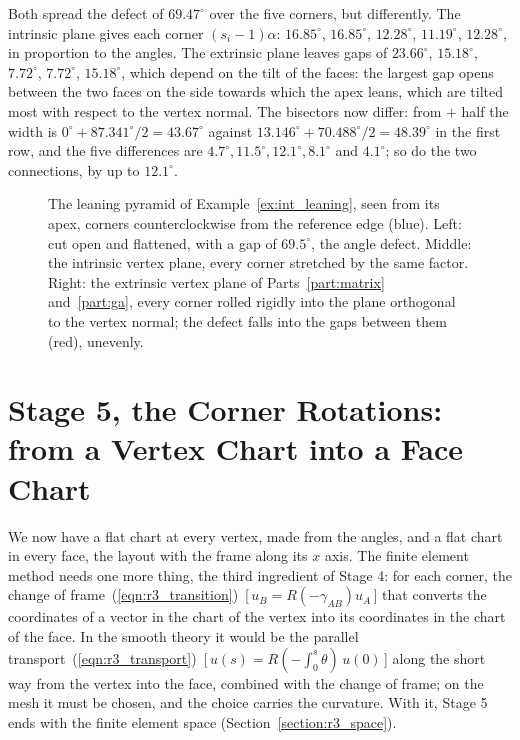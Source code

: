 \begin{example}
Both spread the defect of $69.47^\circ$ over the five corners, but differently. The intrinsic plane gives each corner $(s_i - 1)\alpha$: $16.85^\circ$, $16.85^\circ$, $12.28^\circ$, $11.19^\circ$, $12.28^\circ$, in proportion to the angles. The extrinsic plane leaves gaps of $23.66^\circ$, $15.18^\circ$, $7.72^\circ$, $7.72^\circ$, $15.18^\circ$, which depend on the tilt of the faces: the largest gap opens between the two faces on the side towards which the apex leans, which are tilted most with respect to the vertex normal. The bisectors now differ: from $+$ half the width is $0^\circ + 87.341^\circ/2 = 43.67^\circ$ against $13.146^\circ + 70.488^\circ/2 = 48.39^\circ$ in the first row, and the five differences are $4.7^\circ, 11.5^\circ, 12.1^\circ, 8.1^\circ$ and $4.1^\circ$; so do the two connections, by up to $12.1^\circ$.
\end{example}
\begin{figure}[t]
\centering
{}
\caption{The leaning pyramid of Example~\ref{ex:int_leaning}, seen from its apex, corners counterclockwise from the reference edge (blue). Left: cut open and flattened, with a gap of $69.5^\circ$, the angle defect. Middle: the intrinsic vertex plane, every corner stretched by the same factor. Right: the extrinsic vertex plane of Parts~\ref{part:matrix} and~\ref{part:ga}, every corner rolled rigidly into the plane orthogonal to the vertex normal; the defect falls into the gaps between them (red), unevenly.}
\label{fig:pyramid}
\end{figure}

\section{Stage 5, the Corner Rotations: from a Vertex Chart into a Face Chart}
\label{section:int_connection}

We now have a flat chart at every vertex, made from the angles, and a flat chart in every face, the layout with the frame along its $x$ axis. The finite element method needs one more thing, the third ingredient of Stage 4: for each corner, the change of frame~(\ref{eqn:r3_transition})~[\,$u_B = R(-\gamma_{AB})u_A$\,] that converts the coordinates of a vector in the chart of the vertex into its coordinates in the chart of the face. In the smooth theory it would be the parallel transport~(\ref{eqn:r3_transport})~[\,$u(s) = R(-\int_0^s\theta)\,u(0)$\,] along the short way from the vertex into the face, combined with the change of frame; on the mesh it must be chosen, and the choice carries the curvature. With it, Stage 5 ends with the finite element space (Section~\ref{section:r3_space}).

